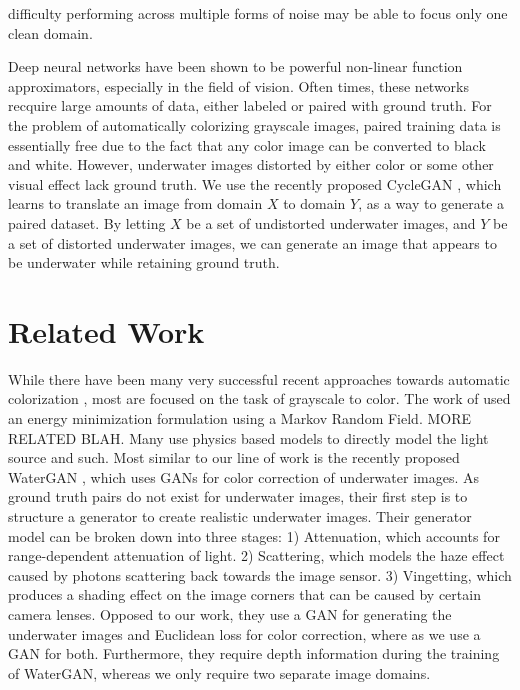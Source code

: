 \documentclass[conference]{IEEEtran}
\begin{document}
\noindent difficulty performing across multiple forms of noise may be able to focus only one clean domain.

Deep neural networks have been shown to be powerful non-linear function approximators, especially in the field of
vision. Often times, these networks recquire large amounts of data, either labeled or paired with ground truth.
For the problem of automatically colorizing grayscale images, paired training data is essentially free due to the
fact that any color image can be converted to black and white. However, underwater images distorted by either color
or some other visual effect lack ground truth. We use the recently proposed CycleGAN \cite{zhu2017unpaired}, which
learns to translate an image from domain $X$ to domain $Y$, as a way to generate a paired dataset. By letting $X$ be
a set of undistorted underwater images, and $Y$ be a set of distorted underwater images, we can generate an image
that appears to be underwater while retaining ground truth.

\section{Related Work}

While there have been many very successful recent approaches towards automatic colorization
\cite{zhang2016colorful,iizuka2016let}, most are focused on the task of grayscale to color.
The work of \cite{torres2005color} used an energy minimization formulation using a Markov Random Field. 
MORE RELATED BLAH. Many use physics based models to directly model the light source and such.
Most similar to our line of work is the recently proposed WaterGAN \cite{li2017watergan}, which uses
GANs for color correction of underwater images. As ground truth pairs do not exist for underwater images,
their first step is to structure a generator to create realistic underwater images. Their generator model
can be broken down into three stages: 1) Attenuation, which accounts for range-dependent attenuation of light.
2) Scattering, which models the haze effect caused by photons scattering back towards the image sensor. 3)
Vingetting, which produces a shading effect on the image corners that can be caused by certain camera lenses.
Opposed to our work, they use a GAN for generating the underwater images and Euclidean loss for color correction,
where as we use a GAN for both. Furthermore, they require depth information during the training of WaterGAN,
whereas we only require two separate image domains.
\end{document}
